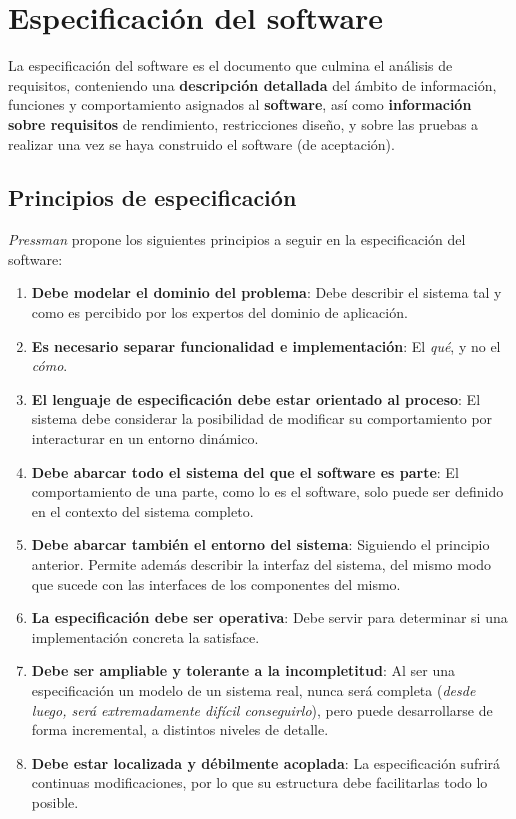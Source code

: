 \section{Especificación del software}

La especificación del software es el documento que culmina el análisis de requisitos, conteniendo una \textbf{descripción detallada} del ámbito de información, funciones y comportamiento asignados al \textbf{software}, así como \textbf{información sobre requisitos} de rendimiento, restricciones diseño, y sobre las pruebas a realizar una vez se haya construido el software (de aceptación).

\subsection{Principios de especificación}

\textit{Pressman} propone los siguientes principios a seguir en la especificación del software:

\begin{enumerate}
    \item \textbf{Debe modelar el dominio del problema}: Debe describir el sistema tal y como es percibido por los expertos del dominio de aplicación.
    \item \textbf{Es necesario separar funcionalidad e implementación}: El \textit{qué}, y no el \textit{cómo}.
    \item \textbf{El lenguaje de especificación debe estar orientado al proceso}: El sistema debe considerar la posibilidad de modificar su comportamiento por interacturar en un entorno dinámico.
    \item \textbf{Debe abarcar todo el sistema del que el software es parte}: El comportamiento de una parte, como lo es el software, solo puede ser definido en el contexto del sistema completo.
    \item \textbf{Debe abarcar también el entorno del sistema}: Siguiendo el principio anterior. Permite además describir la interfaz del sistema, del mismo modo que sucede con las interfaces de los componentes del mismo.
    \item \textbf{La especificación debe ser operativa}: Debe servir para determinar si una implementación concreta la satisface.
    \item \textbf{Debe ser ampliable y tolerante a la incompletitud}: Al ser una especificación un modelo de un sistema real, nunca será completa (\textit{desde luego, será extremadamente difícil conseguirlo}), pero puede desarrollarse de forma incremental, a distintos niveles de detalle.
    \item \textbf{Debe estar localizada y débilmente acoplada}: La especificación sufrirá continuas modificaciones, por lo que su estructura debe facilitarlas todo lo posible. 
\end{enumerate}


